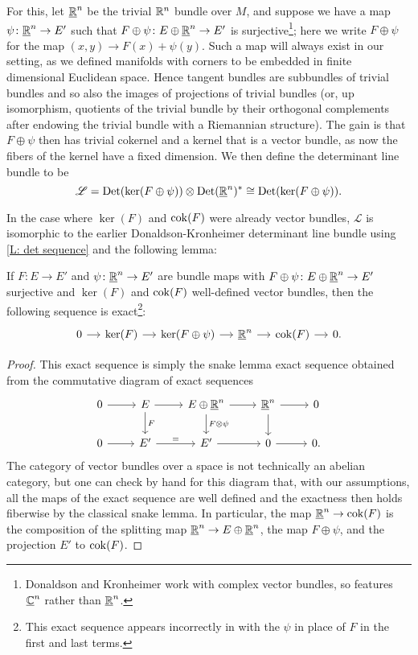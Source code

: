 For this, let $\underline{\mathbb{R}}^n$ be the trivial $\mathbb{R}^n$ bundle over $M$, and suppose we have a map $\psi \colon \underline{\mathbb{R}}^n \to E'$ such that $F \oplus \psi \colon E \oplus \underline{\mathbb{R}}^n \to E'$ is surjective\footnote{Donaldson and Kronheimer work with complex vector bundles, so \cite{DoKr90} features $\underline{\mathbb{C}}^n$ rather than $\underline{\mathbb{R}}^n$.}; here we write $F \oplus \psi$ for the map $(x,y) \to F(x) + \psi(y)$.
Such a map will always exist in our setting, as we defined manifolds with corners to be embedded in finite dimensional Euclidean space.
Hence tangent bundles are subbundles of trivial bundles and so also the images of projections of trivial bundles (or, up isomorphism, quotients of the trivial bundle by their orthogonal complements after endowing the trivial bundle with a Riemannian structure).
The gain is that $F \oplus \psi$ then has trivial cokernel and a kernel that is a vector bundle, as now the fibers of the kernel have a fixed dimension.
We then define the determinant line bundle to be
$$\mathscr L = {\rm Det}(\ker(F \oplus \psi)) \otimes {\rm Det}(\underline{\mathbb{R}}^n)^* \cong {\rm Det}(\ker(F \oplus \psi)).$$

In the case where $\ker(F)$ and ${\rm cok}(F)$ were already vector bundles, $\mathscr L$ is isomorphic to the earlier Donaldson-Kronheimer determinant line bundle using \cref{L: det sequence} and the following lemma:

\begin{lemma}
	If $F \colon E \to E'$ and $\psi \colon \underline{\mathbb{R}}^n \to E'$ are bundle maps with $F \oplus \psi \colon E \oplus \underline{\mathbb{R}}^n \to E'$ surjective and $\ker(F)$ and ${\rm cok}(F)$ well-defined vector bundles, then the following sequence is exact\footnote{This exact sequence appears incorrectly in \cite{DoKr90} with the $\psi$ in place of $F$ in the first and last terms.}:
	\[
	\begin{tikzcd}[column sep=small]
		0 \arrow[r] & \ker(F) \arrow[r] & \ker(F \oplus \psi) \arrow[r] & \underline{\R}^n \arrow[r] & \cok(F) \arrow[r] & 0.
	\end{tikzcd}
	\]
\end{lemma}

\begin{proof}
	This exact sequence is simply the snake lemma exact sequence obtained from the commutative diagram of exact sequences
	\[
	\begin{tikzcd}
		0 \arrow[r] & E \arrow[r] \arrow[d, "F"] & E \oplus \underline{\R}^n \arrow[r] \arrow[d, "F \otimes \psi"] & \underline{\R}^n \arrow[r] \arrow[d] & 0 \\
		0 \arrow[r] & E' \arrow[r, "="] & E' \arrow[r] & 0 \arrow[r] & 0.
	\end{tikzcd}
	\]
	The category of vector bundles over a space is not technically an abelian category, but one can check by hand for this diagram that, with our assumptions, all the maps of the exact sequence are well defined and the exactness then holds fiberwise by the classical snake lemma.
	In particular, the map $\underline{\mathbb{R}}^n \to {\rm cok}(F)$ is the composition of the splitting map $\underline{\mathbb{R}}^n \to E \oplus \underline{\mathbb{R}}^n$, the map $F \oplus \psi$, and the projection $E'$ to ${\rm cok}(F)$.
\end{proof}

